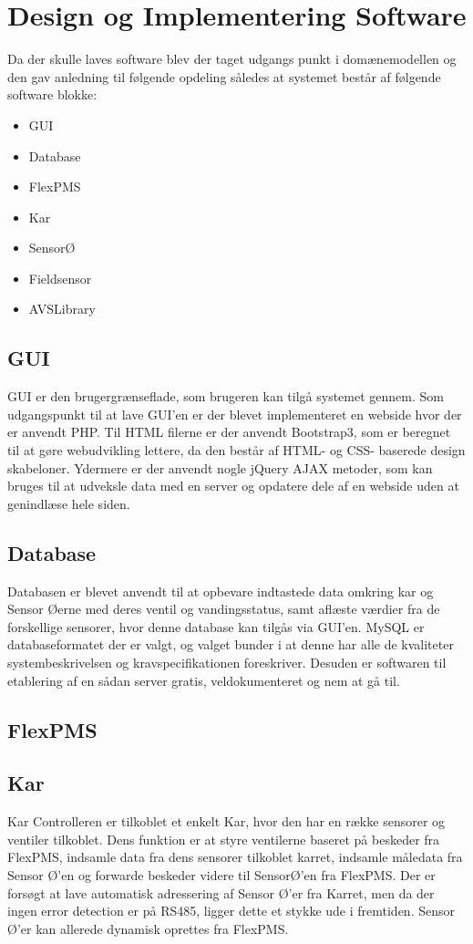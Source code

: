 \section{Design og Implementering Software}
Da der skulle laves software blev der taget udgangs punkt i domænemodellen og den gav anledning til følgende opdeling således at
systemet består af følgende software blokke:
\begin{itemize}
\item GUI
\item Database
\item FlexPMS
\item Kar
\item SensorØ
\item Fieldsensor
\item AVSLibrary
\end{itemize}

\subsection{GUI}
GUI er den brugergrænseflade, som brugeren kan tilgå systemet gennem. Som udgangspunkt til at lave GUI'en er der blevet implementeret en webside hvor der er anvendt PHP. Til HTML filerne er der anvendt Bootstrap3, som er beregnet til at gøre webudvikling lettere, da den består af HTML- og CSS- baserede design skabeloner. Ydermere er der anvendt nogle jQuery AJAX metoder, som kan bruges til at udveksle data med en server og opdatere dele af en webside uden at genindlæse hele siden.

\subsection{Database}
Databasen er blevet anvendt til at opbevare indtastede data omkring kar og Sensor Øerne med deres ventil og vandingsstatus, samt aflæste værdier fra de forskellige sensorer, hvor denne database kan tilgås via GUI'en. MySQL er databaseformatet der er valgt, og valget bunder i at denne har alle de kvaliteter systembeskrivelsen og kravspecifikationen foreskriver. Desuden er softwaren til etablering af en sådan server gratis, veldokumenteret og nem at gå til.

\subsection{FlexPMS}

\subsection{Kar}
Kar Controlleren er tilkoblet et enkelt Kar, hvor den har en række sensorer og ventiler tilkoblet. Dens funktion er at styre ventilerne baseret på beskeder fra FlexPMS, indsamle data fra dens sensorer tilkoblet karret, indsamle måledata fra Sensor Ø'en og forwarde beskeder videre til SensorØ'en fra FlexPMS. Der er forsøgt at lave automatisk adressering af Sensor Ø'er fra Karret, men da der ingen error detection er på RS485, ligger dette et stykke ude i fremtiden. Sensor Ø'er kan allerede dynamisk oprettes fra FlexPMS.

